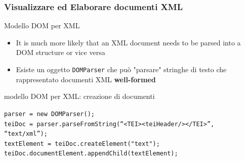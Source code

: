 \begin{frame}
    \frametitle{Visualizzare ed Elaborare documenti XML}
    \addtocounter{nframe}{1}
    

     \begin{block}{Modello DOM per XML}
        \begin{itemize}
            \item  It is much more likely that an XML document needs to be parsed into a DOM structure or vice versa
            \item Esiste un oggetto  \texttt{DOMParser} che può "parsare" stringhe di testo che rappresentato documenti XML \textbf{well-formed}
        \end{itemize}
        
     \end{block}

     \begin{block}{modello DOM per XML: creazione di documenti}
       
        \texttt{parser = new DOMParser();}
        \\\texttt{teiDoc = parser.parseFromString(“<TEI><teiHeader/></TEI>”, “text/xml”);}
        \\\texttt{textElement = teiDoc.createElement("text");}
        \\\texttt{teiDoc.documentElement.appendChild(textElement);}
        
     \end{block}
     
\end{frame}


